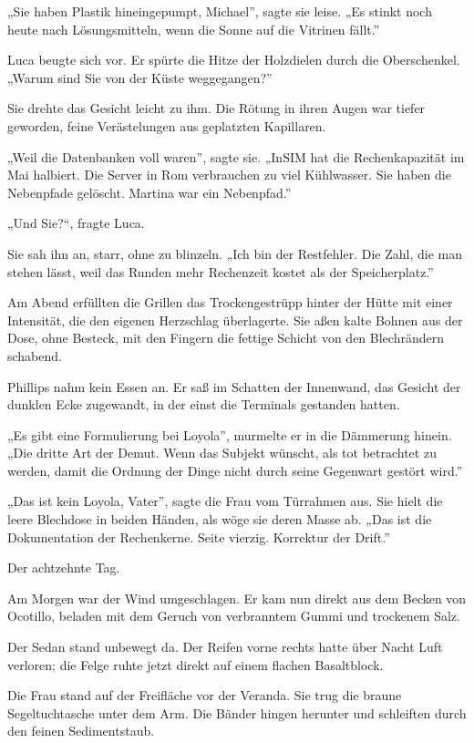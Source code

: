 \documentclass[
  ngerman,
]{article}
\begin{document}
„Sie haben Plastik hineingepumpt, Michael'', sagte sie leise. „Es stinkt
noch heute nach Lösungsmitteln, wenn die Sonne auf die Vitrinen fällt.''

Luca beugte sich vor. Er spürte die Hitze der Holzdielen durch die
Oberschenkel. „Warum sind Sie von der Küste weggegangen?''

Sie drehte das Gesicht leicht zu ihm. Die Rötung in ihren Augen war
tiefer geworden, feine Verästelungen aus geplatzten Kapillaren.

„Weil die Datenbanken voll waren'', sagte sie. „InSIM hat die
Rechenkapazität im Mai halbiert. Die Server in Rom verbrauchen zu viel
Kühlwasser. Sie haben die Nebenpfade gelöscht. Martina war ein
Nebenpfad.''

„Und Sie?{\kern0pt}``, fragte Luca.

Sie sah ihn an, starr, ohne zu blinzeln. „Ich bin der Restfehler. Die
Zahl, die man stehen lässt, weil das Runden mehr Rechenzeit kostet als
der Speicherplatz.''

Am Abend erfüllten die Grillen das Trockengestrüpp hinter der Hütte mit
einer Intensität, die den eigenen Herzschlag überlagerte. Sie aßen kalte
Bohnen aus der Dose, ohne Besteck, mit den Fingern die fettige Schicht
von den Blechrändern schabend.

Phillips nahm kein Essen an. Er saß im Schatten der Innenwand, das
Gesicht der dunklen Ecke zugewandt, in der einst die Terminals gestanden
hatten.

„Es gibt eine Formulierung bei Loyola'', murmelte er in die Dämmerung
hinein. „Die dritte Art der Demut. Wenn das Subjekt wünscht, als tot
betrachtet zu werden, damit die Ordnung der Dinge nicht durch seine
Gegenwart gestört wird.''

„Das ist kein Loyola, Vater'', sagte die Frau vom Türrahmen aus. Sie
hielt die leere Blechdose in beiden Händen, als wöge sie deren Masse ab.
„Das ist die Dokumentation der Rechenkerne. Seite vierzig. Korrektur der
Drift.''

Der achtzehnte Tag.

Am Morgen war der Wind umgeschlagen. Er kam nun direkt aus dem Becken
von Ocotillo, beladen mit dem Geruch von verbranntem Gummi und trockenem
Salz.

Der Sedan stand unbewegt da. Der Reifen vorne rechts hatte über Nacht
Luft verloren; die Felge ruhte jetzt direkt auf einem flachen
Basaltblock.

Die Frau stand auf der Freifläche vor der Veranda. Sie trug die braune
Segeltuchtasche unter dem Arm. Die Bänder hingen herunter und schleiften
durch den feinen Sedimentstaub.
\end{document}
